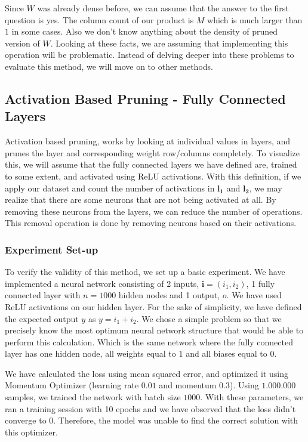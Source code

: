 Since $W$ was already dense before, we can assume that the answer to the first question is yes. The column count of our product is $M$ which is much larger than $1$ in some cases. Also we don't know anything about the density of pruned version of $W$. Looking at these facts, we are assuming that implementing this operation will be problematic. Instead of delving deeper into these problems to evaluate this method, we will move on to other methods.

\subsection{Activation Based Pruning - Fully Connected Layers}
Activation based pruning, works by looking at individual values in layers, and prunes the layer and corresponding weight row/columns completely. To visualize this, we will assume that the fully connected layers we have defined are, trained to some extent, and activated using ReLU activations. With this definition, if we apply our dataset and count the number of activations in $\mathbf{l_1}$ and $\mathbf{l_2}$, we may realize that there are some neurons that are not being activated at all. By removing these neurons from the layers, we can reduce the number of operations. This removal operation is done by removing neurons based on their activations. 

\subsubsection{Experiment Set-up}
To verify the validity of this method, we set up a basic experiment. We have implemented a neural network consisting of 2 inputs, $\mathbf{i} = (i_1, i_2)$, 1 fully connected layer with $n = 1000$ hidden nodes and 1 output, $o$. We have used ReLU \cite{nair2010rectified} activations on our hidden layer. For the sake of simplicity, we have defined the expected output $y$ as $y = i_1 + i_2$. We chose a simple problem so that we precisely know the most optimum neural network structure that would be able to perform this calculation. Which is the same network where the fully connected layer has one hidden node, all weights equal to $1$ and all biases equal to $0$.

We have calculated the loss using mean squared error, and optimized it using Momentum Optimizer (learning rate $0.01$ and momentum $0.3$). Using $1.000.000$ samples, we trained the network with batch size $1000$. With these parameters, we ran a training session with 10 epochs and we have observed that the loss didn't converge to 0. Therefore, the model was unable to find the correct solution with this optimizer. 
